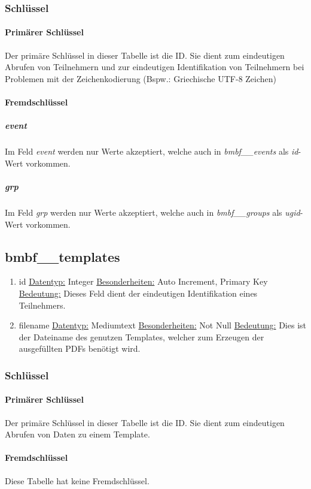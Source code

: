\documentclass[12pt,parskip=full, pagea4]{scrreprt}
\begin{document}
			\subsubsection{Schl\"ussel}
			\paragraph{Prim\"arer Schl\"ussel}Der prim\"are Schl\"ussel in dieser Tabelle ist die ID. Sie dient zum eindeutigen Abrufen von Teilnehmern und zur eindeutigen Identifikation von Teilnehmern bei Problemen mit der Zeichenkodierung (Bspw.: Griechische UTF-8 Zeichen)
			\paragraph{Fremdschl\"ussel}
			\subparagraph{event} \leftskip=1.5cm Im Feld \textit{event} werden nur Werte akzeptiert, welche auch in \textit{bmbf\_\_events} als \textit{id}-Wert vorkommen.
			\subparagraph{grp} \leftskip=1.5cm Im Feld \textit{grp} werden nur Werte akzeptiert, welche auch in \textit{bmbf\_\_groups} als \textit{ugid}-Wert vorkommen.
			\subsection{bmbf\_\_templates}
			\begin{enumerate}
				\item id
				\subitem \underline{Datentyp:} Integer
				\subitem \underline{Besonderheiten:} Auto Increment, Primary Key
				\subitem \underline{Bedeutung:} Dieses Feld dient der eindeutigen Identifikation eines Teilnehmers.
				\item filename
				\subitem \underline{Datentyp:} Mediumtext
				\subitem \underline{Besonderheiten:} Not Null
				\subitem \underline{Bedeutung:} Dies ist der Dateiname des genutzen Templates, welcher zum Erzeugen der ausgefüllten PDFs benötigt wird.
			\end{enumerate}
			\leftskip=0cm
			\subsubsection{Schl\"ussel}
			\paragraph{Prim\"arer Schl\"ussel}Der prim\"are Schl\"ussel in dieser Tabelle ist die ID. Sie dient zum eindeutigen Abrufen von Daten zu einem Template.
			\paragraph{Fremdschl\"ussel} Diese Tabelle hat keine Fremdschl\"ussel.
\end{document}
